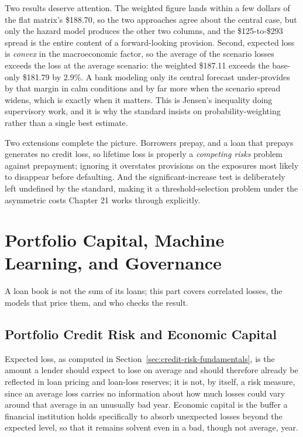 \documentclass[../ai_in_finance]{subfiles}
\begin{document}
Two results deserve attention. The weighted figure lands within a few dollars of the flat matrix's \$188.70, so the two approaches agree about the central case, but only the hazard model produces the other two columns, and the \$125-to-\$293 spread is the entire content of a forward-looking provision. Second, expected loss is \emph{convex} in the macroeconomic factor, so the average of the scenario losses exceeds the loss at the average scenario: the weighted \$187.11 exceeds the base-only \$181.79 by $2.9\%$. A bank modeling only its central forecast under-provides by that margin in calm conditions and by far more when the scenario spread widens, which is exactly when it matters. This is Jensen's inequality doing supervisory work, and it is why the standard insists on probability-weighting rather than a single best estimate.

Two extensions complete the picture. Borrowers prepay, and a loan that prepays generates no credit loss, so lifetime loss is properly a \emph{competing risks} problem against prepayment; ignoring it overstates provisions on the exposures most likely to disappear before defaulting. And the significant-increase test is deliberately left undefined by the standard, making it a threshold-selection problem under the asymmetric costs Chapter 21 works through explicitly.

\section{Portfolio Capital, Machine Learning, and Governance}

A loan book is not the sum of its loans; this part covers correlated losses, the models that price them, and who checks the result.

\subsection{Portfolio Credit Risk and Economic Capital}
\label{sec:portfolio-credit-risk}

Expected loss, as computed in Section~\ref{sec:credit-risk-fundamentals}, is the amount a lender should expect to lose on average and should therefore already be reflected in loan pricing and loan-loss reserves; it is not, by itself, a risk measure, since an average loss carries no information about how much losses could vary around that average in an unusually bad year. Economic capital is the buffer a financial institution holds specifically to absorb unexpected losses beyond the expected level, so that it remains solvent even in a bad, though not average, year.
\end{document}
